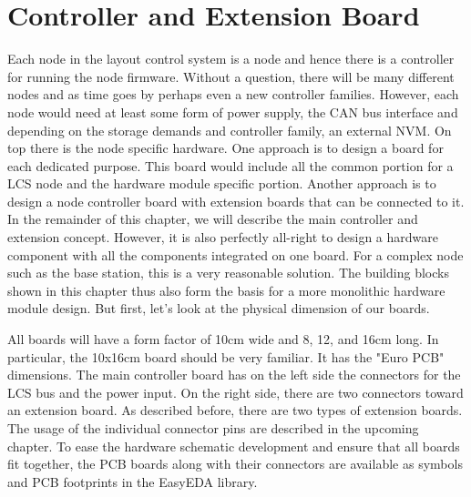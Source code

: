 \section{Controller and Extension Board}

Each node in the layout control system is a node and hence there is a controller for running the node firmware. Without a question, there will be many different nodes and as time goes by perhaps even a new controller families. However, each node would need at least some form of power supply, the CAN bus interface and depending on the storage demands and controller family, an external NVM. On top there is the node specific hardware. One approach is to design a board for each dedicated purpose. This board would include all the common portion for a LCS node and the hardware module specific portion. Another approach is to design a node controller board with extension boards that can be connected to it. In the remainder of this chapter, we will describe the main controller and extension concept. However, it is also perfectly all-right to design a hardware component with all the components integrated on one board. For a complex node such as the base station, this is a very reasonable solution. The building blocks shown in this chapter thus also form the basis for a more monolithic hardware module design. But first, let's look at the physical dimension of our boards.

\begin{center}
\end{center}

All boards will have a form factor of 10cm wide and 8, 12, and 16cm long. In particular, the 10x16cm board should be very familiar. It has the "Euro PCB" dimensions. The main controller board has on the left side the connectors for the LCS bus and the power input. On the right side, there are two connectors toward an extension board. As described before, there are two types of extension boards. The usage of the individual connector pins are described in the upcoming chapter. To ease the hardware schematic development and ensure that all boards fit together, the PCB boards along with their connectors are available as symbols and PCB footprints in the EasyEDA library.

